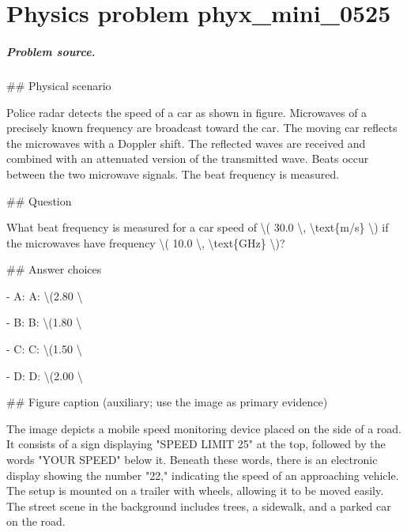
\chapter{Physics problem phyx\_mini\_0525}
\label{ch:PhyXMiniProblems_problem_phyx_mini_0525}

\paragraph{Problem source.}
\#\# Physical scenario

Police radar detects the speed of a car as shown in figure. Microwaves of a precisely known frequency are broadcast toward the car. The moving car reflects the microwaves with a Doppler shift. The reflected waves are received and combined with an attenuated version of the transmitted wave. Beats occur between the two microwave signals. The beat frequency is measured.

\#\# Question

What beat frequency is measured for a car speed of \textbackslash{}( 30.0 \textbackslash{}, \textbackslash{}text\{m/s\} \textbackslash{}) if the microwaves have frequency \textbackslash{}( 10.0 \textbackslash{}, \textbackslash{}text\{GHz\} \textbackslash{})?

\#\# Answer choices

- A: A: \textbackslash{}(2.80 \textbackslash{}

- B: B: \textbackslash{}(1.80 \textbackslash{}

- C: C: \textbackslash{}(1.50 \textbackslash{}

- D: D: \textbackslash{}(2.00 \textbackslash{}

\#\# Figure caption (auxiliary; use the image as primary evidence)

The image depicts a mobile speed monitoring device placed on the side of a road. It consists of a sign displaying "SPEED LIMIT 25" at the top, followed by the words "YOUR SPEED" below it. Beneath these words, there is an electronic display showing the number "22," indicating the speed of an approaching vehicle. The setup is mounted on a trailer with wheels, allowing it to be moved easily. The street scene in the background includes trees, a sidewalk, and a parked car on the road.

